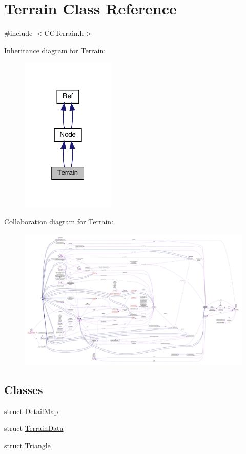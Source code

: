 \hypertarget{classTerrain}{}\section{Terrain Class Reference}
\label{classTerrain}


{\ttfamily \#include $<$C\+C\+Terrain.\+h$>$}



Inheritance diagram for Terrain\+:
\nopagebreak
\begin{figure}[H]
\begin{center}
\leavevmode
\includegraphics[width=127pt]{classTerrain__inherit__graph}
\end{center}
\end{figure}


Collaboration diagram for Terrain\+:
\nopagebreak
\begin{figure}[H]
\begin{center}
\leavevmode
\includegraphics[width=350pt]{classTerrain__coll__graph}
\end{center}
\end{figure}
\subsection*{Classes}
\begin{DoxyCompactItemize}
\item 
struct \hyperlink{structTerrain_1_1DetailMap}{Detail\+Map}
\item 
struct \hyperlink{structTerrain_1_1TerrainData}{Terrain\+Data}
\item 
struct \hyperlink{structTerrain_1_1Triangle}{Triangle}
\end{DoxyCompactItemize}

